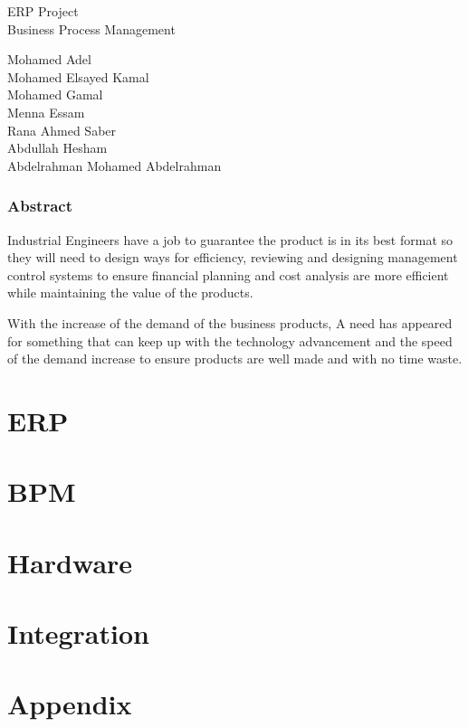 \documentclass[11pt,letterpaper,oneside,openany]{book}
\begin{document}
    \begin{center}
  
        \LARGE ERP Project\\
        \Large Business Process Management

    \end{center}

    \vspace*{\fill}
        \begingroup
        \centering

            \Large Mohamed Adel\\
            \Large Mohamed Elsayed Kamal\\
            \Large Mohamed Gamal\\
            \Large Menna Essam\\
            \Large Rana Ahmed Saber\\
            \Large Abdullah Hesham\\
            \Large Abdelrahman Mohamed Abdelrahman\\
        
        \endgroup
    \vspace*{\fill}

   \newpage

   
   \section{Abstract}
   \large Industrial Engineers have a job to guarantee the product is in its best format so they will need to design ways for efficiency, reviewing and designing management control systems to ensure financial planning and cost analysis are more efficient while maintaining the value of the products.

   With the increase of the demand of the business products, A need has appeared for something that can keep up with the technology advancement and the speed of the demand increase to ensure products are well made and with no time waste. 
   

   \newpage

   \listoffigures

   \newpage

   

   \newpage
    \tableofcontents

    \newpage


    \part{ERP}
    

    \part{BPM}
    

    \part{Hardware}
    

    \part{Integration}
    
    
    \part{Appendix}
    
\end{document}
